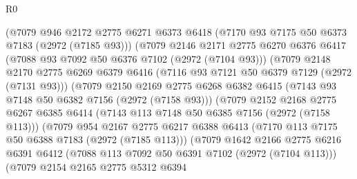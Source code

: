 \begin{lexlean}{R0}
\begin{coremodule}
                      (@7079
                        @946
                        @2172
                        @2775
                        @6271
                        @6373
                        @6418
                        (@7170 @93 @7175 @50 @6373 @7183 (@2972 (@7185 @93)))
                        (@7079
                          @2146
                          @2171
                          @2775
                          @6270
                          @6376
                          @6417
                          (@7088 @93 @7092 @50 @6376 @7102 (@2972 (@7104 @93)))
                          (@7079
                            @2148
                            @2170
                            @2775
                            @6269
                            @6379
                            @6416
                            (@7116 @93 @7121 @50 @6379 @7129 (@2972 (@7131 @93)))
                            (@7079
                              @2150
                              @2169
                              @2775
                              @6268
                              @6382
                              @6415
                              (@7143 @93 @7148 @50 @6382 @7156 (@2972 (@7158 @93)))
                              (@7079
                                @2152
                                @2168
                                @2775
                                @6267
                                @6385
                                @6414
                                (@7143 @113 @7148 @50 @6385 @7156 (@2972 (@7158 @113)))
                                (@7079
                                  @954
                                  @2167
                                  @2775
                                  @6217
                                  @6388
                                  @6413
                                  (@7170 @113 @7175 @50 @6388 @7183 (@2972 (@7185 @113)))
                                  (@7079
                                    @1642
                                    @2166
                                    @2775
                                    @6216
                                    @6391
                                    @6412
                                    (@7088 @113 @7092 @50 @6391 @7102 (@2972 (@7104 @113)))
                                    (@7079
                                      @2154
                                      @2165
                                      @2775
                                      @5312
                                      @6394

\end{coremodule}
\end{lexlean}
